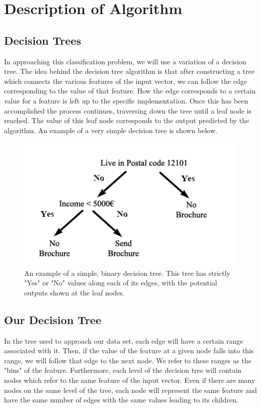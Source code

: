 \documentclass{article}
\begin{document}
	\clearpage
	\section{Description of Algorithm}
	
	\subsection{Decision Trees}
	In approaching this classification problem, we will use a variation of a decision tree. The idea behind the decision tree algorithm is that after constructing a tree which connects the various features of the input vector, we can follow the edge corresponding to the value of that feature. How the edge corresponds to a certain value for a feature is left up to the specific implementation. Once this has been accomplished the process continues, traversing down the tree until a leaf node is reached. The value of this leaf node corresponds to the output predicted by the algorithm. An example of a very simple decision tree is shown below.
	
	\begin{figure}[h]
		\centering
		\includegraphics[height=6.5cm]{basic-tree.jpg}
		\caption{An example of a simple, binary decision tree. This tree has strictly "Yes" or "No" values along each of its edges, with the potential outputs shown at the leaf nodes.}
	\end{figure}
	
	\clearpage
	\subsection{Our Decision Tree}
	In the tree used to approach our data set, each edge will have a certain range associated with it. Then, if the value of the feature at a given node falls into this range, we will follow that edge to the next node. We refer to these ranges as the "bins" of the feature. Furthermore, each level of the decision tree will contain nodes which refer to the same feature of the input vector. Even if there are many nodes on the same level of the tree, each node will represent the same feature and have the same number of edges with the same values leading to its children.
	
\end{document}
